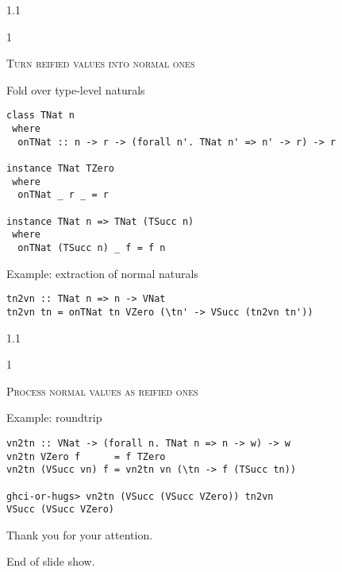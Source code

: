 \documentclass{slides}
\newcommand{\header}[1]{{\large\scshape \color{Red} #1} \medskip }
\newcommand{\blau}[1]{{\color{Blue} #1} \medskip }
\newenvironment{myslide}{\begin{slide}\color{Blue}\begin{boxedminipage}{1.1\hsize}\begin{boxedminipage}{1\hsize}\color{Black}
\vspace{-170\in}
}{%
\smallskip
\end{boxedminipage}
\end{boxedminipage}
\end{slide}}
\begin{document}
\begin{myslide}

\header{Turn reified values into normal ones}

\blau{Fold over type-level naturals}

\begin{Verbatim}[fontseries=normal,fontsize=\tiny]
class TNat n
 where
  onTNat :: n -> r -> (forall n'. TNat n' => n' -> r) -> r
  
instance TNat TZero
 where
  onTNat _ r _ = r

instance TNat n => TNat (TSucc n)
 where
  onTNat (TSucc n) _ f = f n
\end{Verbatim}

\medskip

\blau{Example: extraction of normal naturals}

\begin{Verbatim}[fontseries=normal,fontsize=\tiny]
tn2vn :: TNat n => n -> VNat
tn2vn tn = onTNat tn VZero (\tn' -> VSucc (tn2vn tn'))
\end{Verbatim}

\end{myslide}






\begin{myslide}

\header{Process normal values as reified ones}

\blau{Example: roundtrip}

\begin{Verbatim}[fontseries=normal,fontsize=\tiny]
vn2tn :: VNat -> (forall n. TNat n => n -> w) -> w
vn2tn VZero f      = f TZero
vn2tn (VSucc vn) f = vn2tn vn (\tn -> f (TSucc tn))

ghci-or-hugs> vn2tn (VSucc (VSucc VZero)) tn2vn
VSucc (VSucc VZero)
\end{Verbatim}

\end{myslide}






\begin{slide}

\medskip

Thank you for your attention.

\medskip

End of slide show.

\medskip

\end{slide}



\end{document}
